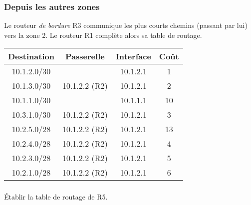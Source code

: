 \documentclass[svgnames,11pt]{beamer}
\begin{document}
\begin{frame}
    \frametitle{Depuis les autres zones}
    Le routeur \emph{de bordure} R3 communique les plus courts chemins (passant par lui) vers la zone 2. Le routeur R1 complète alors sa table de routage.
    \begin{center}
        \begin{tabular}{|*{4}{c|}}
            \hline
            Destination & Passerelle    & Interface & Coût \\
            \hline
            10.1.2.0/30 &               & 10.1.2.1  & 1    \\
            \hline
            10.1.3.0/30 & 10.1.2.2 (R2) & 10.1.2.1  & 2    \\
            \hline
            10.1.1.0/30 &               & 10.1.1.1  & 10   \\
            \hline
            10.3.1.0/30 & 10.1.2.2 (R2) & 10.1.2.1  & 3    \\
            \hline
            10.2.5.0/28 & 10.1.2.2 (R2) & 10.1.2.1  & 13   \\
            \hline
            10.2.4.0/28 & 10.1.2.2 (R2) & 10.1.2.1  & 4    \\
            \hline
            10.2.3.0/28 & 10.1.2.2 (R2) & 10.1.2.1  & 5    \\
            \hline
            10.2.1.0/28 & 10.1.2.2 (R2) & 10.1.2.1  & 6    \\
            \hline
        \end{tabular}
    \end{center}


\end{frame}

\begin{frame}
    \frametitle{}
    \begin{activite}
        Établir la table de routage de R5.
    \end{activite}


\end{frame}
\end{document}
